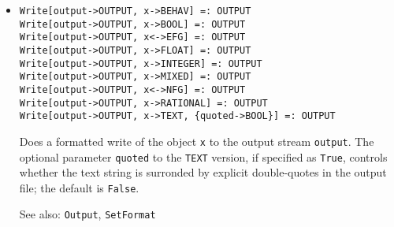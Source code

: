 \begin{itemize}
\item
\protect \large \begin{verbatim}
Write[output->OUTPUT, x->BEHAV] =: OUTPUT 
Write[output->OUTPUT, x->BOOL] =: OUTPUT 
Write[output->OUTPUT, x<->EFG] =: OUTPUT
Write[output->OUTPUT, x->FLOAT] =: OUTPUT
Write[output->OUTPUT, x->INTEGER] =: OUTPUT
Write[output->OUTPUT, x->MIXED] =: OUTPUT
Write[output->OUTPUT, x<->NFG] =: OUTPUT
Write[output->OUTPUT, x->RATIONAL] =: OUTPUT
Write[output->OUTPUT, x->TEXT, {quoted->BOOL}] =: OUTPUT
\end{verbatim}\normalsize

\bd
Does a formatted write of the object \verb+x+ to the
output stream \verb+output+.  The optional parameter \verb+quoted+ to
the {\tt TEXT} version, if specified as \verb+True+, controls whether
the text string is surronded by explicit double-quotes in the output
file; the default is \verb+False+.
\item
[See also:] {\tt Output}, {\tt SetFormat}
\ed




\end{itemize}



